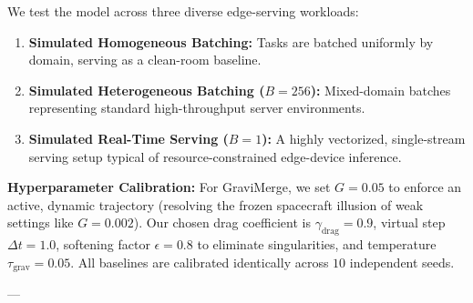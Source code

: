 We test the model across three diverse edge-serving workloads:
\begin{enumerate}
    \item \textbf{Simulated Homogeneous Batching: } Tasks are batched uniformly by domain, serving as a clean-room baseline.
    \item \textbf{Simulated Heterogeneous Batching ($B=256$): } Mixed-domain batches representing standard high-throughput server environments.
    \item \textbf{Simulated Real-Time Serving ($B=1$): } A highly vectorized, single-stream serving setup typical of resource-constrained edge-device inference.
\end{enumerate}

\textbf{Hyperparameter Calibration: } 
For GraviMerge, we set $G = 0.05$ to enforce an active, dynamic trajectory (resolving the frozen spacecraft illusion of weak settings like $G=0.002$). Our chosen drag coefficient is $\gamma_{\text{drag}} = 0.9$, virtual step $\Delta t = 1.0$, softening factor $\epsilon = 0.8$ to eliminate singularities, and temperature $\tau_{\text{grav}} = 0.05$. All baselines are calibrated identically across $10$ independent seeds.

---


